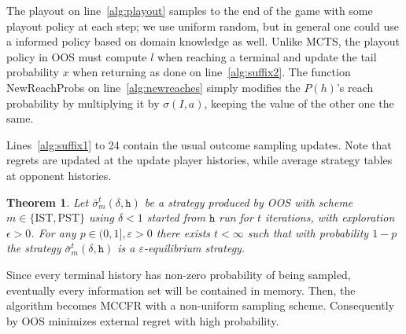 \documentclass[letterpaper]{article}
\newcommand{\cP}{\mathcal{P}}
\newcommand{\tth}{\mathtt{h}}
\newtheorem{theorem}{Theorem}
\newcounter{mlNoteCounter}
\newcommand{\mlnote}[1]{{\scriptsize \color{darkgreen} $\blacksquare$ \refstepcounter{mlNoteCounter}\textsf{[ML]$_{\arabic{mlNoteCounter}}$:{#1}}}}
\begin{document}

The playout on line~\ref{alg:playout} samples to the end of the game with some playout policy at each step; we use uniform random, 
but in general one could use a informed policy based on domain knowledge as well. 
Unlike MCTS, the playout policy in OOS must compute $l$ when reaching a terminal and update the tail probability $x$ when returning
as done on line~\ref{alg:suffix2}. The function NewReachProbs on line~\ref{alg:newreaches} simply modifies the $P(h)$'s reach 
probability by multiplying it by $\sigma(I,a)$, keeping the value of the other one the same.

Lines~\ref{alg:suffix1} to 24
contain the usual outcome sampling updates. Note that regrets are updated at the 
update player histories, while average strategy tables at opponent histories. 

\begin{theorem}
Let $\bar{\sigma}^t_m(\delta,\tth)$ be a strategy produced by OOS with scheme $m \in \{ \mbox{IST}, \mbox{PST} \}$ 
using $\delta < 1$ started from $\tth$ run for $t$ iterations, with exploration $\epsilon > 0$.  
For any $p \in (0, 1], \varepsilon > 0$ there exists $t < \infty$ such that with 
probability $1-p$ the strategy  $\bar{\sigma}^t_m(\delta,\tth)$ is a $\varepsilon$-equilibrium strategy. 
\label{thm:consistency}
\end{theorem}
Since every terminal history has non-zero probability of being sampled, eventually every information 
set will be contained in memory. Then, the algorithm becomes MCCFR with a non-uniform sampling scheme.
Consequently by \cite[Theorem 5]{Lanctot09Sampling} OOS minimizes external regret with high probability.
\end{document}
